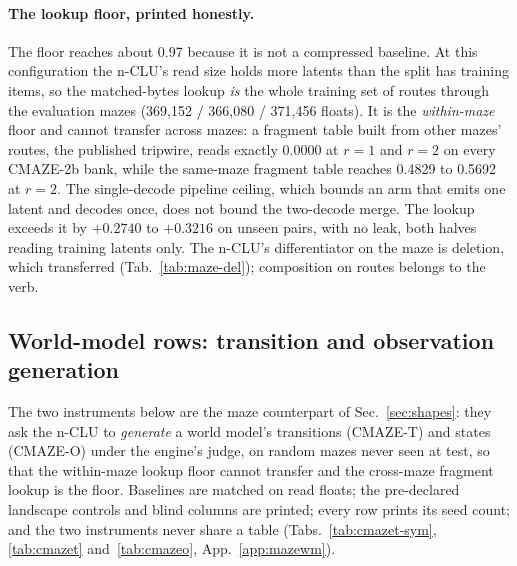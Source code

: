 \documentclass{article} %
\begin{document}
\paragraph{The lookup floor, printed honestly.} The floor reaches about 0.97 because it is not a
compressed baseline. At this configuration the n-CLU's read size holds more latents than the split
has training items, so the matched-bytes lookup \emph{is} the whole training set of routes
through the evaluation mazes (369,152 / 366,080 / 371,456 floats). %
It is the \emph{within-maze} floor and cannot transfer across mazes: a fragment table built
from other mazes' routes, the published tripwire, reads exactly 0.0000 at $r=1$ and $r=2$ on
every CMAZE-2b bank, while the same-maze fragment table reaches 0.4829 to 0.5692 at $r=2$.
The single-decode pipeline ceiling, which bounds an arm that emits one latent and decodes once, does not bound the two-decode merge. The lookup exceeds it by $+0.2740$ to $+0.3216$ on unseen pairs,
with no leak, both halves reading training latents only.
The n-CLU's differentiator on the maze is deletion, which transferred (Tab.~\ref{tab:maze-del}); composition on routes belongs to the verb.

\subsection{World-model rows: transition and observation generation}
\label{sec:maze-wm}

The two instruments below are the maze counterpart of Sec.~\ref{sec:shapes}: they ask the n-CLU to
\emph{generate} a world model's transitions (CMAZE-T) and states (CMAZE-O) under the engine's judge,
on random mazes never seen at test, so that the within-maze lookup floor cannot transfer and the
cross-maze fragment lookup is the floor. Baselines are matched on read floats; the pre-declared
landscape controls and blind columns are printed; every row prints its seed count; and the two
instruments never share a table (Tabs.~\ref{tab:cmazet-sym}, \ref{tab:cmazet}
and~\ref{tab:cmazeo}, App.~\ref{app:mazewm}).
\end{document}

